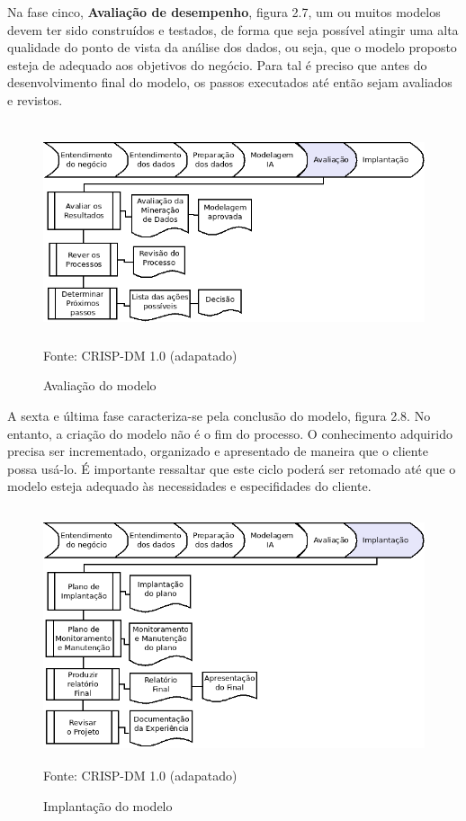 \pagebreak

Na fase cinco, \textbf{Avaliação de desempenho}, figura 2.7, um ou muitos modelos devem ter sido construídos e testados, 
de forma que seja possível atingir uma alta qualidade do ponto de vista da análise dos dados, ou seja, que o 
modelo proposto esteja de adequado aos objetivos do negócio. Para tal é preciso que antes do desenvolvimento final 
do modelo, os passos executados até então sejam avaliados e revistos.

\begin{figure}[!ht]
\centering
\caption{Avaliação do modelo}
\vspace{1mm}
\includegraphics[width=120mm, height=65mm]{Figuras/Cronograma/Avaliacao.png}\\
\tiny Fonte: CRISP-DM 1.0 (adapatado)
\end{figure}

\pagebreak

A sexta e última fase caracteriza-se pela conclusão do modelo, figura 2.8. No entanto, a criação do modelo não é o fim do processo.
O conhecimento adquirido precisa ser incrementado, organizado e apresentado de maneira que o cliente possa usá-lo.
É importante ressaltar que este ciclo poderá ser retomado até que o modelo esteja adequado às necessidades e especifidades do cliente.

\begin{figure}[!ht]
\centering
\caption{Implantação do modelo}
\vspace{1mm}
\includegraphics[width=120mm, height=75mm]{Figuras/Cronograma/Implantacao.png}\\
\tiny Fonte: CRISP-DM 1.0 (adapatado)
\end{figure}

